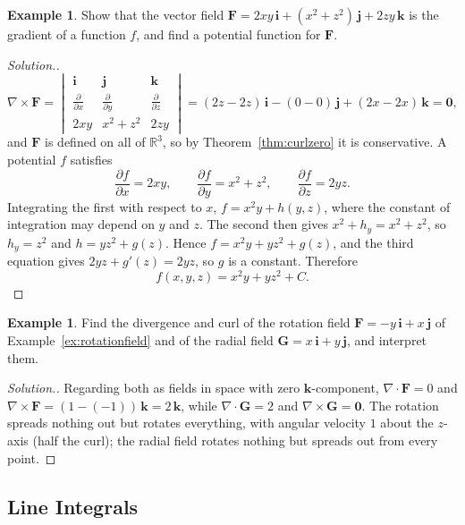 \documentclass[11pt,a4paper]{article}
\theoremstyle{definition}
\newtheorem{exa}[thm]{Example}
\newenvironment{solution}
  {\renewcommand{\qedsymbol}{}\begin{proof}[\textit{Solution}.]}
  {\end{proof}}
\begin{document}
\begin{exa}
\label{ex:potential3}
Show that the vector field
$\mathbf F = 2xy\,\mathbf i + (x^2 + z^2)\,\mathbf j + 2zy\,\mathbf k$ is the
gradient of a function $f$, and find a potential function for $\mathbf F$.
\end{exa}

\begin{solution}
\[\nabla \times \mathbf F = \begin{vmatrix}
\mathbf i & \mathbf j & \mathbf k\\[1ex]
\frac{\partial}{\partial x} & \frac{\partial}{\partial y} & \frac{\partial}
{\partial z}\\[1ex]
2xy & x^2+ z^2 & 2zy
\end{vmatrix} = (2z - 2z)\,\mathbf i - (0 - 0)\,\mathbf j + (2x - 2x)\,\mathbf k
= \mathbf 0 ,\]
and $\mathbf F$ is defined on all of $\mathbb{R}^3$, so by
Theorem~\ref{thm:curlzero} it is conservative. A potential $f$ satisfies
\[\frac{\partial f}{\partial x} = 2xy ,\qquad \frac{\partial f}{\partial y}=
x^2+z^2 ,\qquad \frac{\partial f}{\partial z} = 2yz .\]
Integrating the first with respect to $x$, $f = x^2y + h(y,z)$, where the
constant of integration may depend on $y$ and $z$. The second then gives
$x^2 + h_y = x^2 + z^2$, so $h_y = z^2$ and $h = yz^2 + g(z)$. Hence
$f = x^2y + yz^2 + g(z)$, and the third equation gives $2yz + g'(z) = 2yz$, so
$g$ is a constant. Therefore
\[f(x,y,z) = x^2y + yz^2 + C .\]
\end{solution}

\begin{exa}
\label{ex:divcurlrot}
Find the divergence and curl of the rotation field
$\mathbf F = -y\,\mathbf i + x\,\mathbf j$ of Example~\ref{ex:rotationfield} and
of the radial field $\mathbf G = x\,\mathbf i + y\,\mathbf j$, and interpret
them.
\end{exa}

\begin{solution}
Regarding both as fields in space with zero $\mathbf k$-component,
$\nabla\cdot\mathbf F = 0$ and $\nabla\times\mathbf F = (1 - (-1))\,\mathbf k =
2\,\mathbf k$, while $\nabla\cdot\mathbf G = 2$ and $\nabla\times\mathbf G =
\mathbf 0$. The rotation spreads nothing out but rotates everything, with angular
velocity $1$ about the $z$-axis (half the curl); the radial field rotates nothing
but spreads out from every point.
\end{solution}

{\color[wave]{485}\subsection{Line Integrals}}
\end{document}
